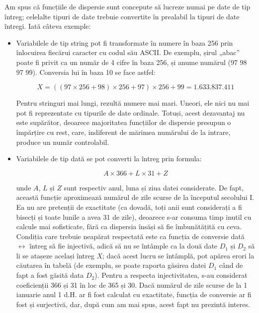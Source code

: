 Am spus că funcțiile de dispersie sunt concepute să lucreze numai pe date de
tip întreg; celelalte tipuri de date trebuie convertite în prealabil la tipuri
de date întregi. Iată câteva exemple:

\begin{itemize}

\item Variabilele de tip string pot fi transformate în numere în baza 256 prin
  înlocuirea fiecărui caracter cu codul său ASCII. De exemplu, șirul „abac”
  poate fi privit ca un număr de 4 cifre în baza 256, și anume numărul (97 98
  97 99). Conversia lui în baza 10 se face astfel:

  \begin{equation}
    X = ((97 \times  256 + 98) \times 256 + 97) \times 256 + 99 = 1.633.837.411
  \end{equation}


  Pentru stringuri mai lungi, rezultă numere mai mari. Uneori, ele nici nu mai
  pot fi reprezentate cu tipurile de date ordinale. Totuși, acest dezavantaj
  nu este supărător, deoarece majoritatea funcțiilor de dispersie presupun o
  împărțire cu rest, care, indiferent de mărimea numărului de la intrare,
  produce un număr controlabil.

\item Variabilele de tip dată se pot converti la întreg prin formula:

  \begin{equation}
    A \times 366 + L \times 31 + Z
  \end{equation}

  unde $A$, $L$ și $Z$ sunt respectiv anul, luna și ziua datei considerate. De
  fapt, această funcție aproximează numărul de zile scurse de la începutul
  secolului I. Ea nu are pretenții de exactitate (ca dovadă, toți anii sunt
  considerați a fi bisecți și toate lunile a avea 31 de zile), deoarece s-ar
  consuma timp inutil cu calcule mai sofisticate, fără ca dispersia însăși să
  fie îmbunătățită cu ceva. Condiția care trebuie neapărat respectată este ca
  funcția de conversie dată $\leftrightarrow$ întreg să fie injectivă, adică
  să nu se întâmple ca la două date $D_1$ și $D_2$ să li se atașeze același
  întreg $X$; dacă acest lucru se întâmplă, pot apărea erori la căutarea în
  tabelă (de exemplu, se poate raporta găsirea datei $D_1$ când de fapt a fost
  găsită data $D_2$). Pentru a respecta injectivitatea, s-au considerat
  coeficienții 366 și 31 în loc de 365 și 30. Dacă numărul de zile scurse de
  la 1 ianuarie anul 1 d.H. ar fi fost calculat cu exactitate, funcția de
  conversie ar fi fost și surjectivă, dar, după cum am mai spus, acest fapt nu
  prezintă interes.


\end{itemize}
